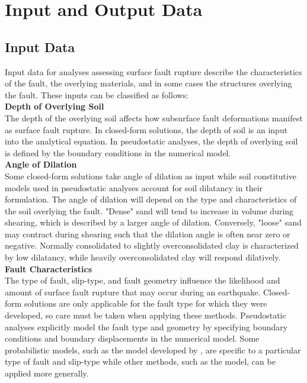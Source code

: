 \section{Input and Output Data}
\label{sec:eq_surface_rup_input_output}

\subsection{Input Data}

Input data for analyses assessing surface fault rupture describe the characteristics of the fault, the overlying materials, and in some cases the structures overlying the fault. These inputs can be classified as follows:\\

\noindent\textbf{Depth of Overlying Soil}\\
The depth of the overlying soil affects how subsurface fault deformations manifest as surface fault rupture. In closed-form solutions, the depth of soil is an input into the analytical equation. In pseudostatic analyses, the depth of overlying soil is defined by the boundary conditions in the numerical model.\\

\noindent\textbf{Angle of Dilation}\\
Some closed-form solutions take angle of dilation as input while soil constitutive models used in pseudostatic analyses account for soil dilatancy in their formulation. The angle of dilation will depend on the type and characteristics of the soil overlying the fault. "Dense" sand will tend to increase in volume during shearing, which is described by a larger angle of dilation. Conversely, "loose" sand may contract during shearing such that the dilation angle is often near zero or negative. Normally consolidated to slightly overconsolidated clay is characterized by low dilatancy, while heavily overconsolidated clay will respond dilatively.\\

\noindent\textbf{Fault Characteristics}\\
The type of fault, slip-type, and fault geometry influence the likelihood and amount of surface fault rupture that may occur during an earthquake. Closed-form solutions are only applicable for the fault type for which they were developed, so care must be taken when applying these methods. Pseudostatic analyses explicitly model the fault type and geometry by specifying boundary conditions and boundary displacements in the numerical model. Some probabilistic models, such as the model developed by \cite{moss2011probabilistic}, are specific to a particular type of fault and slip-type while other methods, such as the \cite{hecker2013variability} model, can be applied more generally.\\

